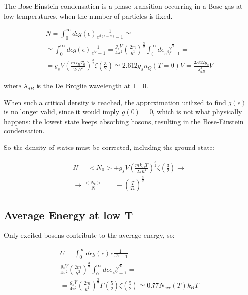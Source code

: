 \documentclass{article}
\begin{document}
The Bose Einstein condensation is a phase transition occurring in a Bose gas at low temperatures,
when the number of particles is fixed.

\begin{equation}
    \begin{aligned}
         & N=\int_0^\infty d\epsilon g(\epsilon)\frac{1}{e^{\beta(\epsilon-\mu)}-1}\simeq                                                                                                                                  \\
         & \simeq \int_0^\infty d\epsilon g(\epsilon)\frac{1}{e^{\beta \epsilon}-1}=\frac{g_sV}{4\pi^2}\left(\frac{2m}{\hbar^2}\right)^{\frac{3}{2}}\int_0^\infty d\epsilon \frac{\sqrt{\epsilon}}{e^{\beta_0\epsilon}-1}= \\
         & =g_sV\left(\frac{mk_BT_0}{2\pi\hbar^2}\right)^{\frac{3}{2}}\zeta\left(\frac{3}{2}\right)\simeq 2.612 g_s n_Q(T=0) V= \frac{2.612 g_s}{\lambda_{dB}^3}V
    \end{aligned}
\end{equation}

where $\lambda_{dB}$ is the De Broglie wavelength at T=0.

When such a critical density is reached, the approximation utilized to find $g(\epsilon)$ is no
longer valid, since it would imply $g(0)=0$, which is not what physically happens: the lowest state keeps
absorbing bosons, resulting in the Bose-Einstein condensation.

So the density of states must be corrected, including the ground state:

\begin{equation}
    \begin{aligned}
         & N=<N_0>+g_s V \left(\frac{mk_BT}{2\pi \hbar^2}\right)^{\frac{3}{2}}\zeta\left(\frac{3}{2}\right) \rightarrow \\
         & \rightarrow \frac{<N_0>}{N}=1-\left(\frac{T}{T_0}\right)^{\frac{3}{2}}
    \end{aligned}
\end{equation}

\subsection{Average Energy at low T}

Only excited bosons contribute to the average energy, so:

\begin{equation}
    \begin{aligned}
         & U=\int_0^\infty d\epsilon g(\epsilon) \epsilon\frac{1}{e^{\beta\epsilon}-1}=                                                                           \\
         & \frac{g_sV}{4\pi^2}\left(\frac{2m}{\hbar^2}\right)^{\frac{3}{2}}\int_0^\infty d\epsilon \epsilon\frac{\sqrt{\epsilon}}{e^{\beta\epsilon}-1}=           \\
         & = \frac{g_sV}{4\pi^2}\left(\frac{2m}{\hbar^2}\right)^{\frac{3}{2}}\Gamma\left(\frac{5}{2}\right)\zeta\left(\frac{5}{2}\right)\simeq 0.77N_{ecc}(T)k_BT
    \end{aligned}
\end{equation}
\end{document}
